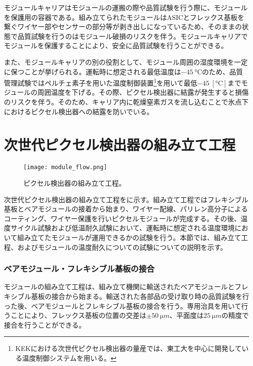 モジュールキャリアはモジュールの運搬の際や品質試験を行う際に、モジュールを保護用の容器である。組み立てられたモジュールはASICとフレックス基板を繋ぐワイヤー部やセンサーの部分等が剥き出しになっているため、そのままの状態で品質試験を行うのはモジュール破損のリスクを伴う。モジュールキャリアでモジュールを保護することにより、安全に品質試験を行うことができる。

また、モジュールキャリアの別の役割として、モジュール周囲の湿度環境を一定に保つことが挙げられる。運転時に想定される最低温度は$-45\ \si{\degreeCelsius}$のため、品質管理試験ではペルチェ素子を用いた温度制御装置\footnote{KEKにおける次世代ピクセル検出器の量産では、東工大を中心に開発している温度制御システムを用いる。}を用いて最低$-45\ [\si{\degreeCelsius}]$までモジュールの周囲温度を下げる。その際、ピクセル検出器に結露が発生すると損傷のリスクを伴う。そのため、キャリア内に乾燥窒素ガスを流し込むことで氷点下におけるピクセル検出器への結露を防いでいる。

\section{次世代ピクセル検出器の組み立て工程}
\label{sec:assemble}
\begin{figure}[tbp]
  \centering
  \texttt{[image: module\_flow.png]}
  \caption[ピクセル検出器の組み立て工程]{ピクセル検出器の組み立て工程。 }
  \label{fig:assemble}
\end{figure}


次世代ピクセル検出器の組み立て工程をに示す。組み立て工程ではフレキシブル基板とベアモジュールの接着から始まり、ワイヤー配線、パリレン高分子によるコーティング、ワイヤー保護を行いピクセルモジュールが完成する。その後、温度サイクル試験および低温耐久試験において、運転時に想定される温度環境において組み立てたモジュールが運用できるかの試験を行う。本節では、組み立て工程、およびモジュールの温度耐久についての試験についての説明を示す。

\subsubsection*{ベアモジュール・フレキシブル基板の接合}

モジュールの組み立て工程は、組み立て機関に輸送されたベアモジュールとフレキシブル基板の接合から始まる。輸送された各部品の受け取り時の品質試験を行った後、ベアモジュールとフレキシブル基板の接合を行う。専用治具を用いて行うことにより、フレックス基板の位置の交差は$\pm 50\ \si{\micro m}$、平面度は$25\ \si{\micro m}$の精度で接合を行うことができる。

